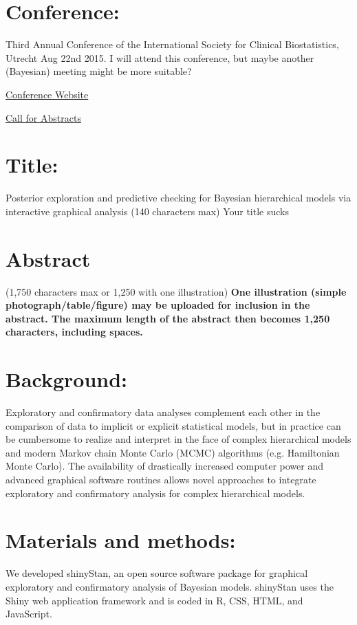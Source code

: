 \documentclass[11pt,notitlepage]{article}
\begin{document}
\section*{Conference:}

Third Annual Conference of the International Society for Clinical Biostatistics, Utrecht Aug 22nd 2015. I will attend this conference, but maybe another (Bayesian) meeting might be more suitable?

\href{http://www.iscb.info/ISCB2015.html}{Conference Website}

\href{http://www.iscb2015.info/abstract-submission}{Call for Abstracts}



\section*{Title:}

Posterior exploration and predictive checking for Bayesian hierarchical models via interactive graphical analysis (140 characters max) Your title sucks
\section*{Abstract}
(1,750 characters max or 1,250 with one illustration) \textbf{One illustration (simple photograph/table/figure) may be uploaded for inclusion in the abstract. The maximum length of the abstract then becomes 1,250 characters, including spaces.}

\section*{Background:}
Exploratory and confirmatory data analyses complement each other in the comparison of data to implicit or explicit statistical models, but in practice can be cumbersome to realize and interpret in the face of complex hierarchical models and modern Markov chain Monte Carlo (MCMC) algorithms (e.g. Hamiltonian Monte Carlo). The availability of drastically increased computer power and advanced graphical software routines allows novel approaches to integrate exploratory and confirmatory analysis for complex hierarchical models.
  
\section*{Materials and methods:}
We developed shinyStan, an open source software package for graphical exploratory and confirmatory analysis of Bayesian models. shinyStan uses the Shiny web application framework and is coded in R, CSS, HTML, and JavaScript.  
\end{document}
